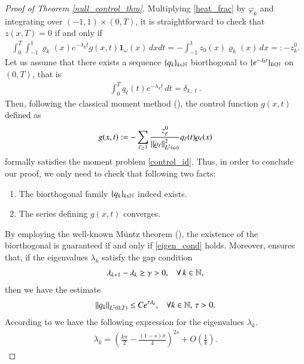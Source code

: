 \begin{proof}[Proof of Theorem \ref{null_control_thm}]
Multiplying \eqref{heat_frac} by $\varphi_k$ and integrating over $(-1,1)\times (0,T)$, it is straightforward to check that $z(x,T)=0$ if and only if 
\begin{align}\label{control_id}
	\int_0^T\int_{-1}^1 \varrho_k(x)e^{-\lambda_kt}g(x,t)\mathbf{1}_{\omega}(x)\,dxdt = -\int_{-1}^1 z_0(x)\varrho_k(x)\,dx=:-z_k^0.
\end{align}
Let us assume that there exists a sequence $\{q_k\}_{k\in\mathbb{N}}$ biorthogonal to $\{e^{-\lambda_k t}\}_{k\in\mathbb{N}}$ on $(0,T)$, that is	
\begin{align*}
	\int_0^T q_\ell(t)e^{-\lambda_k t}\,dt = \delta_{k,\ell}.
\end{align*}
Then, following the classical moment method (\cite{fattorini1971exact}), the control function $g(x,t)$ defined as 
\begin{align}\label{g_def}
	g(x,t):= -\sum_{\ell\geq 1} \frac{z_\ell^0}{{\left\|\varrho_\ell\right\|}_{L^2(\omega)}^2} q_\ell(t)\varrho_\ell(x)
\end{align}
formally satisfies the moment problem \eqref{control_id}. Thus, in order to conclude our proof, we only need to check that following two facts:
\begin{enumerate}
	\item The biorthogonal family $\{q_k\}_{k\in\mathbb{N}}$ indeed exists. 
	\item The series defining $g(x,t)$ converges.
\end{enumerate}

By employing the well-known M\"untz theorem (\cite[Page 24]{schwartz1958etude}), the existence of the biorthogonal is guaranteed if and only if \eqref{eigen_cond} holds. Moreover, \cite[Theorem 1.1]{fattorini1974uniform} ensures that, if the eigenvalues $\lambda_k$ satisfy the gap condition
\begin{align}\label{gap}
	\lambda_{k+1}-\lambda_k\geq\gamma>0,\;\;\;\forall\,k\in\mathbb{N},
\end{align} 
then we have the estimate
\begin{align}\label{biorth_est}
	{\left\|q_k\right\|}_{L^2(0,T)}\leq Ce^{\tau\lambda_k},\;\;\;\forall k\in\mathbb{N},\,\tau>0.
\end{align}
According to \cite{kulczycki2010spectral,kwasnicki2012eigenvalues} we have the following expression for the eigenvalues $\lambda_k$.
\begin{align*}
	\lambda_k = \left(\frac{k\pi}{2}-\frac{(1-s)\pi}{4}\right)^{2s}+O\left(\frac{1}{k}\right).
\end{align*}


\end{proof}
